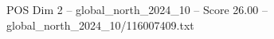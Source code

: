 \begin{textsample}{POS Dim 2 – global\_north\_2024\_10 – Score 26.00 – global\_north\_2024\_10/116007409.txt}
\end{textsample}
